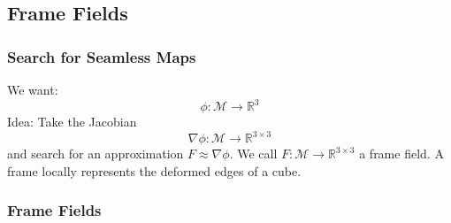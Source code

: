 \documentclass[
	11pt, %
	aspectratio=169, %
]{beamer}
\begin{document}

\subsection{Frame Fields}
\begin{frame}
	\frametitle{Search for Seamless Maps}
	We want:
	$$\phi : \mathcal{M} \to \mathbb{R}^3$$
	Idea: Take the Jacobian
	$$\nabla \phi : \mathcal{M} \to \mathbb{R}^{3\times3}$$
	and search for an approximation $F \approx \nabla \phi$. We call $F : \mathcal{M} \to \mathbb{R}^{3\times3}$ a \alert{frame field}.
	A \alert{frame} locally represents the deformed edges of a cube.
\end{frame}

\begin{frame}
	\frametitle{Frame Fields}
	\begin{columns}[c] %
	

\end{columns}
\end{frame}
\end{document}
